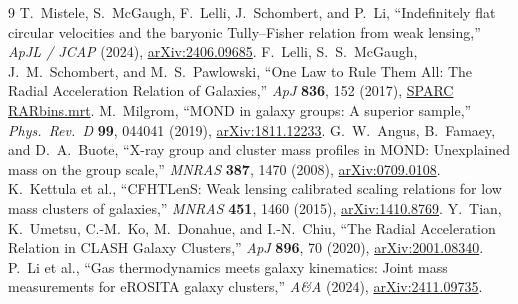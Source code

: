 \documentclass[11pt,a4paper]{article}
\begin{document}
\begin{thebibliography}{9}
 T.~Mistele, S.~McGaugh, F.~Lelli, J.~Schombert, and P.~Li, ``Indefinitely flat circular velocities and the baryonic Tully--Fisher relation from weak lensing,'' \textit{ApJL / JCAP} (2024), \href{https://arxiv.org/html/2406.09685v1}{arXiv:2406.09685}.
 F.~Lelli, S.~S.~McGaugh, J.~M.~Schombert, and M.~S.~Pawlowski, ``One Law to Rule Them All: The Radial Acceleration Relation of Galaxies,'' \textit{ApJ} \textbf{836}, 152 (2017), \href{https://astroweb.cwru.edu/SPARC/RARbins.mrt}{SPARC RARbins.mrt}.
 M.~Milgrom, ``MOND in galaxy groups: A superior sample,'' \textit{Phys.\ Rev.\ D} \textbf{99}, 044041 (2019), \href{https://arxiv.org/html/1811.12233v2}{arXiv:1811.12233}.
 G.~W.~Angus, B.~Famaey, and D.~A.~Buote, ``X-ray group and cluster mass profiles in MOND: Unexplained mass on the group scale,'' \textit{MNRAS} \textbf{387}, 1470 (2008), \href{https://arxiv.org/html/0709.0108v3}{arXiv:0709.0108}.
 K.~Kettula et al., ``CFHTLenS: Weak lensing calibrated scaling relations for low mass clusters of galaxies,'' \textit{MNRAS} \textbf{451}, 1460 (2015), \href{https://arxiv.org/html/1410.8769v2}{arXiv:1410.8769}.
 Y.~Tian, K.~Umetsu, C.-M.~Ko, M.~Donahue, and I.-N.~Chiu, ``The Radial Acceleration Relation in CLASH Galaxy Clusters,'' \textit{ApJ} \textbf{896}, 70 (2020), \href{https://arxiv.org/html/2001.08340v2}{arXiv:2001.08340}.
 P.~Li et al., ``Gas thermodynamics meets galaxy kinematics: Joint mass measurements for eROSITA galaxy clusters,'' \textit{A\&A} (2024), \href{https://arxiv.org/html/2411.09735v1}{arXiv:2411.09735}.
\end{thebibliography}
\end{document}
